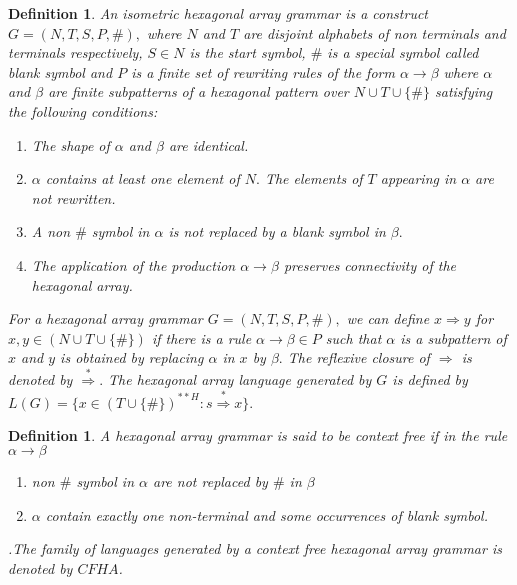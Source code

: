 \documentclass[11pt]{article}
\newtheorem{definition}[theorem]{Definition}
\begin{document}
\begin{definition}An isometric hexagonal array grammar is a construct $G=(N,T,S,P,\#),$ where $N$ and $T$ are disjoint
 alphabets of non terminals and terminals respectively, $S\in N$ is the start symbol, $\#$ is a special symbol called
 blank symbol and $P$ is a finite set of rewriting rules of the form $\alpha\rightarrow\beta$ where $\alpha$ and $\beta$
  are finite subpatterns of a hexagonal pattern over $N\cup T\cup\{\#\}$ satisfying the following conditions:
\begin{enumerate}
\item The shape of $\alpha$ and $\beta$ are identical.
\item $\alpha$ contains at least one element of $N.$ The elements of $T$ appearing in $\alpha$ are not rewritten.
\item A non $\#$ symbol in $\alpha$ is not replaced by a blank symbol in $\beta.$
\item The application of the production $\alpha\rightarrow\beta$ preserves connectivity of the hexagonal array.
\end{enumerate}

For a hexagonal array grammar $G=(N,T,S,P,\#),$ we can define
$x\Longrightarrow y$ for $x,y\in(N\cup T\cup\{\#\})$ if there is a
rule $\alpha\rightarrow\beta\in P$ such that $\alpha$ is a
subpattern of $x$ and $y$ is obtained by replacing $\alpha$ in $x$
by $\beta.$ The reflexive closure of $\Rightarrow$ is denoted by
$\overset{*}{\Rightarrow}.$ The hexagonal array language generated
by $G$ is defined by
$L(G)=\{x\in(T\cup\{\#\})^{**H}:s\overset{*}\Rightarrow x\}.$

\end{definition}
\begin{definition}A hexagonal array grammar is said to be context free if in the rule $\alpha\rightarrow\beta$
\begin{enumerate}
\item non $\#$ symbol in $\alpha$ are not replaced by $\#$ in $\beta$
\item $\alpha$ contain exactly one non-terminal and some occurrences of blank symbol.
\end{enumerate}.The family of languages generated by a context
free hexagonal array grammar is denoted by $CFHA$.
\end{definition}
\vspace{5cm }
\end{document}
